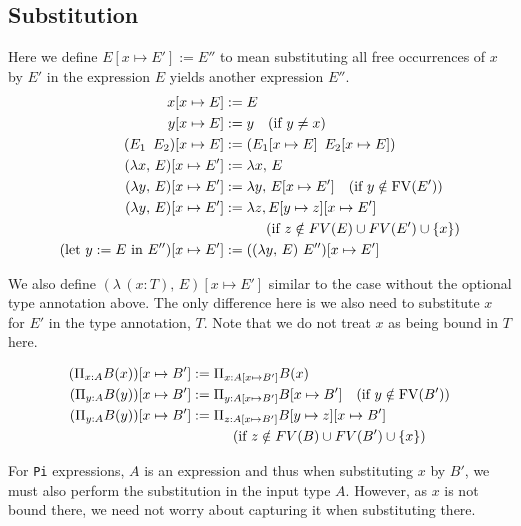 \documentclass{article}
\begin{document}
\subsection{Substitution}
Here we define $E [x \mapsto E'] := E''$ to mean substituting all free
occurrences of $x$ by $E'$ in the expression $E$ yields another expression $E''$.
\begin{align*}
  x[x \mapsto E] &:= E \\
  y[x \mapsto E] &:= y \quad (\text{if } y \ne x) \\
  (E_1 \,\,\, E_2) [x \mapsto E] &:= (E_1 [x \mapsto E] \,\,\, E_2 [x \mapsto E]) \\
  (\lambda x, \, E) [x \mapsto E'] &:= \lambda x, \, E \\ 
  (\lambda y, \, E) [x \mapsto E'] &:= \lambda y, \, E[x \mapsto E'] \quad (\text{if } y \notin \operatorname{FV}(E')) \\ 
  (\lambda y, \, E) [x \mapsto E'] &:= \lambda z, E[y \mapsto z][x \mapsto E'] \\
                 &\quad \quad \quad (\text{if } z \notin FV(E) \cup FV(E') \cup \{x\}) \\
  (\text{let } y := E \text{ in } E'') [x \mapsto E'] &:= 
    ((\lambda y, \, E) \,\, E'') [x \mapsto E']
\end{align*}

We also define $(\lambda \, (x : T), \, E) [x \mapsto E']$
similar to the case without the optional type annotation above. The only
difference here is we also need to substitute $x$ for $E'$ in the type annotation,
$T$. Note that we do not treat $x$ as being bound in $T$ here.

\begin{align*}
  (\Pi_{x : A} B(x)) [x \mapsto B'] &:= \Pi_{x : A[x \mapsto B']} B(x) \\ 
  (\Pi_{y : A} B(y)) [x \mapsto B'] &:= \Pi_{y : A[x \mapsto B']} B[x \mapsto B'] \quad (\text{if } y \notin \operatorname{FV}(B')) \\ 
  (\Pi_{y : A} B(y)) [x \mapsto B'] &:= \Pi_{z : A[x \mapsto B']} B[y \mapsto z][x \mapsto B'] \\
                 &\quad \quad \quad (\text{if } z \notin FV(B) \cup FV(B') \cup \{x\})
\end{align*}

For \verb|Pi| expressions, $A$ is an expression and thus when substituting $x$ by
$B'$, we must also perform the substitution in the input type $A$. However, as
$x$ is not bound there, we need not worry about capturing it when substituting there. 
\end{document}
